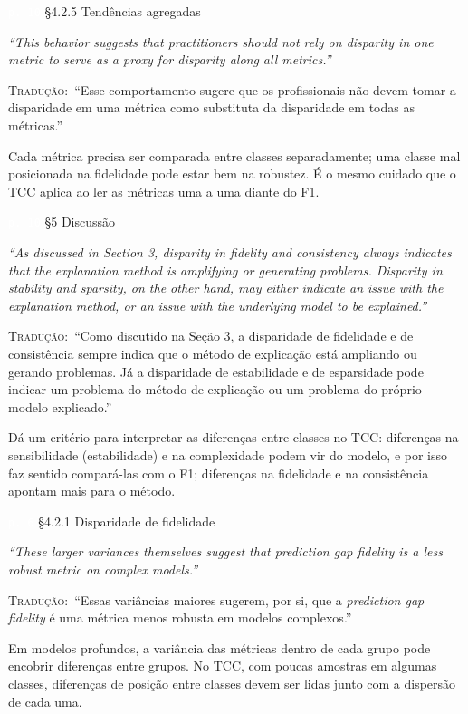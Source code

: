 \documentclass[11pt,a4paper]{article}
\newcommand{\pagechip}[1]{{\setlength{\fboxsep}{1.5pt}\colorbox{cAcc}{\textcolor{white}{\scriptsize\texttt{#1}}}}}
\newenvironment{origquote}{\par\itshape\small}{\par}
\newenvironment{tradquote}{\par\small\textsc{Tradução:}\ }{\par}
\newcommand{\explab}[1]{\par\smallskip{\small\color{cAcc}\textbf{\MakeUppercase{#1}}}\par}
\begin{document}
\begin{citacard}{\pagechip{p. 10} §4.2.5 Tendências agregadas}
\begin{origquote}“This behavior suggests that practitioners should not rely on disparity in one metric to serve as a proxy for disparity along all metrics.”\end{origquote}
\begin{tradquote}“Esse comportamento sugere que os profissionais não devem tomar a disparidade em uma métrica como substituta da disparidade em todas as métricas.”\end{tradquote}
\explab{Explicação}
Cada métrica precisa ser comparada entre classes separadamente; uma classe mal posicionada na fidelidade pode estar bem na robustez. É o mesmo cuidado que o TCC aplica ao ler as métricas uma a uma diante do F1.
\end{citacard}

\begin{citacard}{\pagechip{p. 10} §5 Discussão}
\begin{origquote}“As discussed in Section 3, disparity in fidelity and consistency always indicates that the explanation method is amplifying or generating problems. Disparity in stability and sparsity, on the other hand, may either indicate an issue with the explanation method, or an issue with the underlying model to be explained.”\end{origquote}
\begin{tradquote}“Como discutido na Seção 3, a disparidade de fidelidade e de consistência sempre indica que o método de explicação está ampliando ou gerando problemas. Já a disparidade de estabilidade e de esparsidade pode indicar um problema do método de explicação ou um problema do próprio modelo explicado.”\end{tradquote}
\explab{Explicação}
Dá um critério para interpretar as diferenças entre classes no TCC: diferenças na sensibilidade (estabilidade) e na complexidade podem vir do modelo, e por isso faz sentido compará-las com o F1; diferenças na fidelidade e na consistência apontam mais para o método.
\end{citacard}

\begin{citacard}{\pagechip{p. 6} §4.2.1 Disparidade de fidelidade}
\begin{origquote}“These larger variances themselves suggest that prediction gap fidelity is a less robust metric on complex models.”\end{origquote}
\begin{tradquote}“Essas variâncias maiores sugerem, por si, que a \textit{prediction gap fidelity} é uma métrica menos robusta em modelos complexos.”\end{tradquote}
\explab{Explicação}
Em modelos profundos, a variância das métricas dentro de cada grupo pode encobrir diferenças entre grupos. No TCC, com poucas amostras em algumas classes, diferenças de posição entre classes devem ser lidas junto com a dispersão de cada uma.
\end{citacard}
\end{document}

